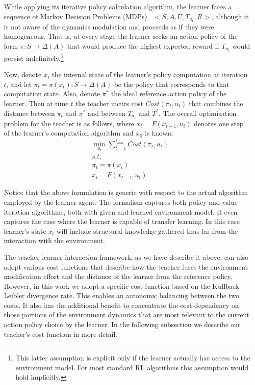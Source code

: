 \documentclass[letterpaper]{aamas2010}
\begin{document}
While applying its iterative policy calculation algorithm, the learner
faces a sequence of Markov Decision Problems (MDPs)~\cite{puterman_book_94}
$<S,A,U,T_{u_t},R>$, although it is not aware of the dynamics
modulation and proceeds as if they were homogeneous. That is, at every
stage the learner seeks an action policy of the form
$\pi:S\rightarrow\Delta(A)$ that would produce the highest expected
reward if $T_{u_t}$ would persist indefinitely.\footnote{This latter
  assumption is explicit only if the learner actually has access to
  the environment model. For most standard RL algorithms this
  assumption would hold implicitly.}

Now, denote $x_t$ the internal state of the learner's policy
computation at iteration $t$, and let
$\pi_t=\pi(x_t):S\rightarrow\Delta(A)$ be the policy that corresponds
to that computation state. Also, denote $\pi^*$ the ideal reference
action policy of the learner. Then at time $t$ the teacher incurs cost
$Cost(\pi_t,u_t)$ that combines the distance between $\pi_t$ and
$\pi^*$ and between $T_{u_t}$ and $T^*$. The overall optimisation
problem for the teacher is as follows, where $x_t=F(x_{t-1},u_t)$
denotes one step of the learner's computation algorithm and $x_0$ is
known:
\begin{eqnarray*}
&\min\limits_{u_t}\sum\limits_{t=1}^{t_{max}}Cost(\pi_t,u_t)\\
&s.t.\\
&\pi_t=\pi(x_t)\\
&x_t=F(x_{t-1},u_t)
\end{eqnarray*}

Notice that the above formulation is generic with respect to the
actual algorithm employed by the learner agent. The formalism captures
both policy and value iteration algorithms, both with given and
learned environment model. It even captures the case where the learner
is capable of transfer learning. In this case learner's state $x_t$
will include structural knowledge gathered thus far from the
interaction with the environment. 

The teacher-learner interaction framework, as we have describe it
above, can also adopt various cost functions that describe how the
teacher fuses the environment modification effort and the distance of
the learner from the reference policy. However, in this work we adopt
a specific cost function based on the Kullback-Leibler divergence
rate. This enables an autonomic balancing between the two costs. It also
has the additional benefit to concentrate the cost dependency on those
portions of the environment dynamics that are most relevant to the
current action policy choice by the learner. In the following
subsection we describe our teacher's cost function in more detail.
\end{document}
